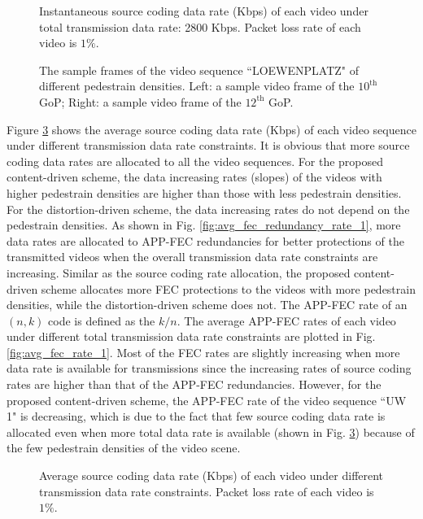 \documentclass[journal]{IEEEtran}
\begin{document}
\begin{figure}[tb]
\caption{Instantaneous source coding data rate (Kbps) of each video under total transmission data rate: 2800 Kbps. Packet loss rate of each video is $1\%$.}\label{fig:inst_dataRate_2800_1}
\end{figure}
\begin{figure}[tb]
\caption{The sample frames of the video sequence ``LOEWENPLATZ" of different pedestrain densities. Left: a sample video frame of the $10^{\text{th}}$ GoP; Right: a sample video frame of the $12^{\text{th}}$ GoP.}
\label{fig:humanDensityChange_1}
\end{figure}

Figure \ref{fig:avg_dataRate_1} shows the average source coding data rate (Kbps) of each video sequence under different transmission data rate constraints. It is obvious that more source coding data rates are allocated to all the video sequences. For the proposed content-driven scheme, the data increasing rates (slopes) of the videos with higher pedestrain densities are higher than those with less pedestrain densities. For the distortion-driven scheme, the data increasing rates do not depend on the pedestrain densities. As shown in Fig. \ref{fig:avg_fec_redundancy_rate_1}, more data rates are allocated to APP-FEC redundancies for better protections of the transmitted videos when the overall transmission data rate constraints are increasing. Similar as the source coding rate allocation, the proposed content-driven scheme allocates more FEC protections to the videos with more pedestrain densities, while the distortion-driven scheme does not. The APP-FEC rate of an $\left(n,k\right)$ code is defined as the $k/n$. The average APP-FEC rates of each video under different total transmission data rate constraints are plotted in Fig. \ref{fig:avg_fec_rate_1}. Most of the FEC rates are slightly increasing when more data rate is available for transmissions since the increasing rates of source coding rates are higher than that of the APP-FEC redundancies. However, for the proposed content-driven scheme, the APP-FEC rate of the video sequence ``UW 1" is decreasing, which is due to the fact that few source coding data rate is allocated even when more total data rate is available (shown in Fig. \ref{fig:avg_dataRate_1}) because of the few pedestrain densities of the video scene.

\begin{figure}[tb]
\caption{Average source coding data rate (Kbps) of each video under different transmission data rate constraints. Packet loss rate of each video is $1\%$.}\label{fig:avg_dataRate_1}
\end{figure}
\clearpage
\end{document}
